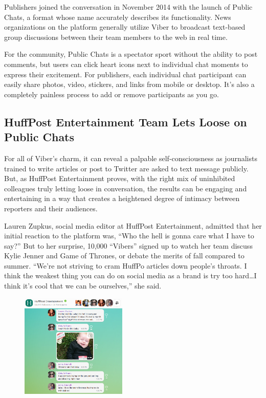 \documentclass[notoc, symmetric, nobib, nols]{towcenter-guideto-book}
\begin{document}
Publishers joined the conversation in November 2014 with the launch of Public Chats, a format whose name accurately describes its functionality. News organizations on the platform generally utilize Viber to broadcast text-based group discussions between their team members to the web in real time.

For the community, Public Chats is a spectator sport without the ability to post comments, but users can click heart icons next to individual chat moments to express their excitement. For publishers, each individual chat participant can easily share photos, video, stickers, and links from mobile or desktop. It's also a completely painless process to add or remove participants as you go.  

\subsection{HuffPost Entertainment Team Lets Loose on Public Chats}

For all of Viber's charm, it can reveal a palpable self-consciousness as journalists trained to write articles or post to Twitter are asked to text message publicly. But, as HuffPost Entertainment proves, with the right mix of uninhibited colleagues truly letting loose in conversation, the results can be engaging and entertaining in a way that creates a heightened degree of intimacy between reporters and their audiences.

Lauren Zupkus, social media editor at HuffPost Entertainment, admitted that her initial reaction to the platform was, ``Who the hell is gonna care what I have to say?'' But to her surprise, 10,000 ``Vibers'' signed up to watch her team discuss Kylie Jenner and Game of Thrones, or debate the merits of fall compared to summer. ``We're not striving to cram HuffPo articles down people's throats. I think the weakest thing you can do on social media as a brand is try too hard\ldots I think it's cool that we can be ourselves,'' she said.  

\begin{figure}
\includegraphics[width=0.45\textwidth]{graphics/CHATAPPS_Page33_Viber.png}
\end{figure}
\end{document}
